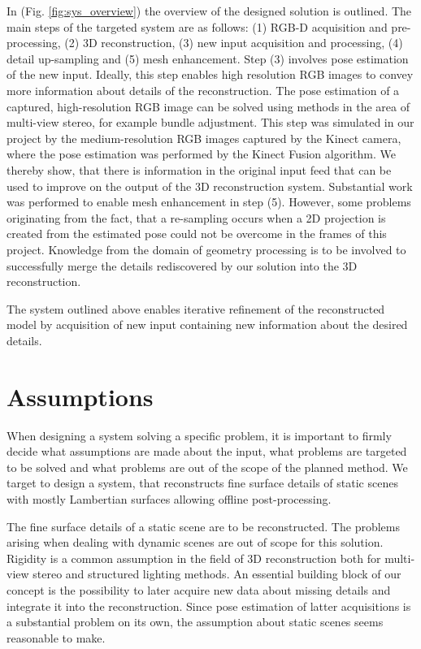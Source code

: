 \documentclass{ucl_thesis}
\newcommand{\figref}[1]{(Fig. \ref{#1})}
\begin{document}
\par In \figref{fig:sys_overview} the overview of the designed solution is outlined. The main steps of the targeted system are as follows: (1) RGB-D acquisition and pre-processing, (2) 3D reconstruction, (3) new input acquisition and processing, (4) detail up-sampling and (5) mesh enhancement. Step (3) involves pose estimation of the new input. Ideally, this step enables high resolution RGB images to convey more information about details of the reconstruction. The pose estimation of a captured, high-resolution RGB image can be solved using methods in the area of multi-view stereo, for example bundle adjustment. This step was simulated in our project by the medium-resolution RGB images captured by the Kinect camera, where the pose estimation was performed by the Kinect Fusion algorithm. We thereby show, that there is information in the original input feed that can be used to improve on the output of the 3D reconstruction system. Substantial work was performed to enable mesh enhancement in step (5). However, some problems originating from the fact, that a re-sampling occurs when a 2D projection is created from the estimated pose could not be overcome in the frames of this project. Knowledge from the domain of geometry processing is to be involved to successfully merge the details rediscovered by our solution into the 3D reconstruction.

\par The system outlined above enables iterative refinement of the reconstructed model by acquisition of new input containing new information about the desired details.

\section{Assumptions}
\label{sec:assumptions}

\par When designing a system solving a specific problem, it is important to firmly decide what assumptions are made about the input, what problems are targeted to be solved and what problems are out of the scope of the planned method. We target to design a system, that reconstructs fine surface details of static scenes with mostly Lambertian surfaces allowing offline post-processing. \\

\par The fine surface details of a static scene are to be reconstructed. The problems arising when dealing with dynamic scenes are out of scope for this solution. Rigidity is a common assumption in the field of 3D reconstruction both for multi-view stereo and structured lighting methods. An essential building block of our concept is the possibility to later acquire new data about missing details and integrate it into the reconstruction. Since pose estimation of latter acquisitions is a substantial problem on its own, the assumption about static scenes seems reasonable to make. \\
\end{document}
